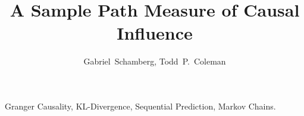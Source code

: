 \documentclass[conference]{IEEEtran}
\begin{document}
\title{A Sample Path Measure of Causal Influence}
%

\author{
Gabriel~Schamberg,
Todd~P.~Coleman
}

\maketitle


\begin{abstract}

\end{abstract}


\begin{IEEEkeywords}
Granger Causality, KL-Divergence, Sequential Prediction, Markov Chains.
\end{IEEEkeywords}

\IEEEpeerreviewmaketitle









\ifCLASSOPTIONcaptionsoff
  \newpage
\fi
\end{document}
